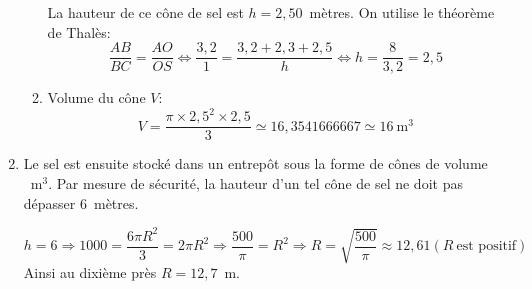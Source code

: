 \begin{enumerate}
\begin{enumerate}
La hauteur de ce cône de sel est $h=2,50$~mètres. On utilise le théorème de Thalès:
\[
\frac{AB}{BC}=\frac{AO}{OS}\Longleftrightarrow \frac{3,2}{1}=\frac{3,2+2,3+2,5}{h}\Longleftrightarrow h=\frac{8}{3,2}=2,5
\]
 
\item Volume du cône $V$:
\[
V=\frac{\pi\times 2,5^2\times 2,5}{3}\simeq 16,3541666667\simeq 16~\text{m}^3
\]
\end{enumerate} 
\item Le sel est ensuite stocké dans un entrepôt sous la forme de cônes de volume ~m$^3 $. Par mesure de sécurité, la hauteur d'un tel cône de sel ne doit pas dépasser $6$~mètres. 

\[
h = 6 \Longrightarrow 1000 = \frac{6\pi R^2}{3}=2\pi R^2\Longrightarrow \frac{500}{\pi}= R^2 \Longrightarrow R =  \sqrt{\frac{500}{\pi}} \approx 12,61 (R\ \text{est positif})
\]
Ainsi au dixième près $R = 12,7$~m.
\end{enumerate}
 
